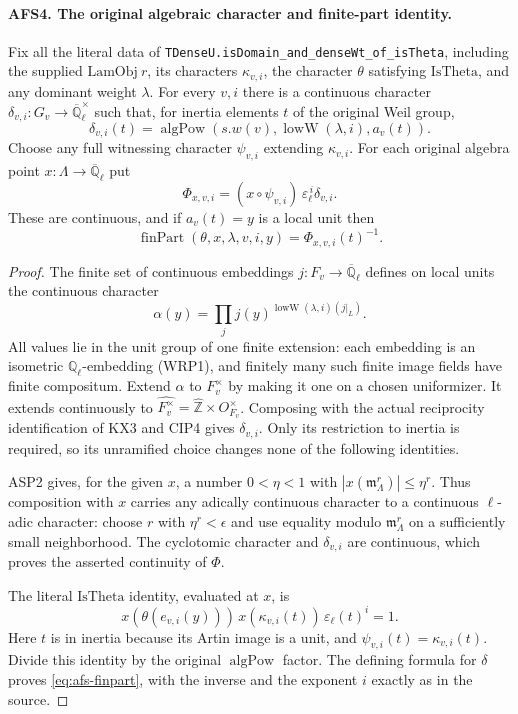 \documentclass[11pt,a4paper]{article}
\numberwithin{equation}{section}
\theoremstyle{remark}\newtheorem{remark}[theorem]{Remark}
\begin{document}
\paragraph{AFS4. The original algebraic character and finite-part identity.}
\label{claim:AFS4}
Fix all the literal data of
\texttt{TDense\allowbreak U.\allowbreak is\allowbreak Domain\_\allowbreak and\_\allowbreak dense\allowbreak Wt\_\allowbreak of\_\allowbreak is\allowbreak Theta}, including
the supplied $\mathrm{LamObj}\ r$, its characters $\kappa_{v,i}$,
the character $\theta$ satisfying $\mathrm{IsTheta}$, and any
dominant weight $\lambda$.  For every $v,i$ there is a
continuous character $\delta_{v,i}:G_v\to
\overline{\mathbb Q}_\ell^{\times}$ such that, for inertia
elements $t$ of the original Weil group,
\[
 \delta_{v,i}(t)=
  \operatorname{algPow}(s.w(v),\operatorname{lowW}(\lambda,i),a_v(t)).
\]
Choose any full witnessing character $\psi_{v,i}$ extending
$\kappa_{v,i}$.  For each original algebra point
$x:\Lambda\to\overline{\mathbb Q}_\ell$ put
\[
 \Phi_{x,v,i}=(x\circ\psi_{v,i})\,
                     \varepsilon_\ell^{\,i}\delta_{v,i}.
\]
These are continuous, and if $a_v(t)=y$ is a local unit then
\begin{equation}\label{eq:afs-finpart}
 \operatorname{finPart}(\theta,x,\lambda,v,i,y)
                       =\Phi_{x,v,i}(t)^{-1}.
\end{equation}
\begin{proof}
The finite set of continuous embeddings
$j:F_v\to\overline{\mathbb Q}_\ell$ defines on local units
the continuous character
\[
 \alpha(y)=\prod_jj(y)^{
          \operatorname{lowW}(\lambda,i)(j|_L)}.
\]
All values lie in the unit group of one finite extension:
each embedding is an isometric $\mathbb Q_\ell$-embedding
(WRP1), and finitely many such finite image fields have finite
compositum.  Extend $\alpha$ to $F_v^{\times}$ by making it
one on a chosen uniformizer.  It extends continuously to
$\widehat{F_v^{\times}}=\widehat{\mathbb Z}\times O_{F_v}^{\times}$.
Composing with the actual reciprocity identification of KX3
and CIP4 gives $\delta_{v,i}$.  Only its restriction to inertia
is required, so its unramified choice changes none of the
following identities.

ASP2 gives, for the given $x$, a number $0<\eta<1$ with
$|x(\mathfrak m_\Lambda^r)|\leq\eta^r$.  Thus composition
with $x$ carries any adically continuous character to a
continuous $\ell$-adic character: choose $r$ with
$\eta^r<\epsilon$ and use equality modulo
$\mathfrak m_\Lambda^r$ on a sufficiently small neighborhood.
The cyclotomic character and $\delta_{v,i}$ are continuous,
which proves the asserted continuity of $\Phi$.

The literal $\mathrm{IsTheta}$ identity, evaluated at $x$, is
\[
 x(\theta(e_{v,i}(y)))\,x(\kappa_{v,i}(t))\,
                     \varepsilon_\ell(t)^i=1.
\]
Here $t$ is in inertia because its Artin image is a unit,
and $\psi_{v,i}(t)=\kappa_{v,i}(t)$.  Divide this identity by
the original $\operatorname{algPow}$ factor.  The defining
formula for $\delta$ proves \eqref{eq:afs-finpart}, with the
inverse and the exponent $i$ exactly as in the source.
\end{proof}
\end{document}
